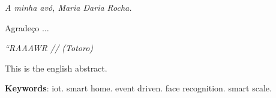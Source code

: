 \documentclass[
12pt,        %
openright,   %
twoside,     %
a4paper,     %
brazil,       %
english       %
%
%
]{ppgca}
\begin{document}
\begin{dedicatoria}
   \vspace*{\fill}
   \centering
   \noindent
   \textit{A minha avó, Maria Daria Rocha.} \vspace*{\fill}
\end{dedicatoria}

\begin{agradecimentos}
Agradeço $\ldots$
\end{agradecimentos}

\begin{epigrafe}
    \vspace*{\fill}
        \begin{flushright}
                \textit{``RAAAWR //
                          (Totoro)}
        \end{flushright}
\end{epigrafe}




\begin{resumo}[Abstract]
   This is the english abstract.

   \vspace{\onelineskip}

   \noindent \textbf{Keywords}: iot. smart home. event driven. face recognition. smart scale.
\end{resumo}


\listoffigures*
\cleardoublepage
\end{document}
